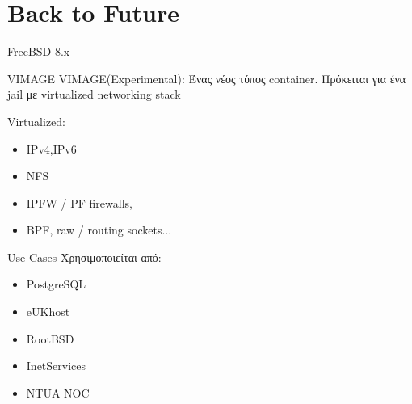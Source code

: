 \documentclass{beamer}
\begin{document}
\section{Back to Future}
    \begin{frame}{FreeBSD 8.x}
        \begin{block}{VIMAGE}
            VIMAGE(Experimental): Ένας νέος τύπος container. Πρόκειται για ένα jail με virtualized networking stack
        \end{block}
        Virtualized:
        \begin{itemize}
            \item IPv4,IPv6
            \item NFS
            \item IPFW / PF firewalls,
            \item BPF, raw / routing sockets...
        \end{itemize}
    \end{frame}

    \begin{frame}{Use Cases}
        Χρησιμοποιείται από:
        \begin{itemize}
            \item PostgreSQL
            \item eUKhost
            \item RootBSD
            \item InetServices
            \item NTUA NOC
        \end{itemize}
    \end{frame}
\end{document}
